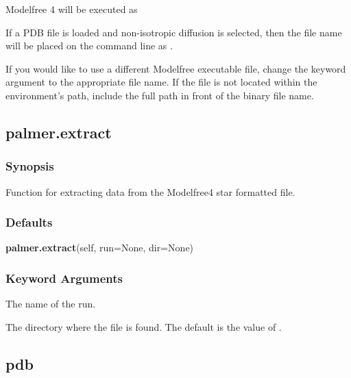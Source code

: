  Modelfree 4 will be executed as 
  


 If a PDB file is loaded and non-isotropic diffusion is selected, then the file name will be placed on the command line as . 
  

 If you would like to use a different Modelfree executable file, change the keyword argument  to the appropriate file name.  If the file is not located within the environment's path, include the full path in front of the binary file name. 
  

  

 \newpage 

 \subsection{palmer.extract} 

  
 \subsubsection{Synopsis} 

 Function for extracting data from the Modelfree4  star formatted file. 
  

  
 \subsubsection{Defaults} 

 \textsf{\textbf{palmer.extract}(self, run=None, dir=None)} 

  
 \subsubsection{Keyword Arguments} 

   The name of the run.   

   The directory where the file  is found.  The default is the value of .  

  

  

 \newpage 

 \subsection{pdb} 

